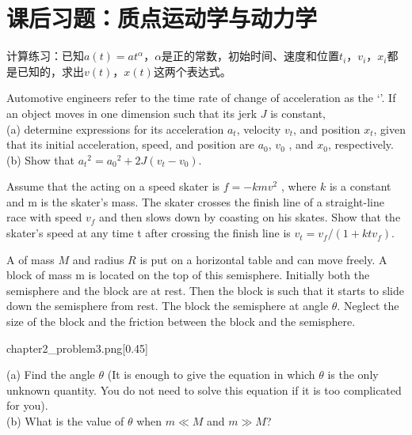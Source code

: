 \section{课后习题：质点运动学与动力学}
\begin{example}
	计算练习：已知$a(t)=at^{\alpha }$，$\alpha$是正的常数，初始时间、速度和位置$t_{i}$，$v_{i}$，$x_{i}$都是已知的，求出$v(t)$，$x(t)$这两个表达式。 
\end{example}
\begin{example}
	Automotive engineers refer to the time rate of change
	of acceleration as the `'. If an object moves in one dimension such that its jerk $J$ is constant,\\   
	(a) determine expressions for its acceleration $a_{t}$, velocity $v_{t}$, and position $x_{t}$, given that its initial acceleration, speed, and position are $a_{0}$, $ v_{0} $ , and $x_{0}$, respectively.\\
	(b) Show that $ a_{t}{}^ {2} = a_{0}{}^ {2}  +2J(  v_ {t}  -  v_ {0}  )$.
\end{example}

\begin{example}
	Assume that the  acting on a speed skater
	is $f=- kmv^ {2} $ , where $k$ is a constant and m is the skater's
	mass. The skater crosses the finish line of a straight-line
	race with speed $ v_ {f } $ and then slows down by coasting on
	his skates. Show that the skater's speed at any time t
	after crossing the finish line is $v_{t} = v_ {f}  / (1+  ktv_ {f}  )$.
	
\end{example}

\begin{example}
	A  of mass $M$ and radius $R$ is put on a  horizontal table and can move freely.
	A block of mass m is located on the top of this semisphere.
	Initially both the semisphere and the block are at rest.
	Then the block is  such that it starts to slide down the semisphere from rest.
	The block  the semisphere at angle $\theta$.
	Neglect the size of the block and the friction between the block and the semisphere.
	
	\begin{singlefigure}[第四题图]{chapter2_problem3.png}[0.45]
	\end{singlefigure}
	
	(a) Find the angle $\theta$ (It is enough to give the equation in which $\theta$ is the only unknown quantity. You do not need to solve this equation if it is too complicated for you).\\
	(b) What is the value of $\theta$ when $m \ll M$ and $m \gg M$?
\end{example}

